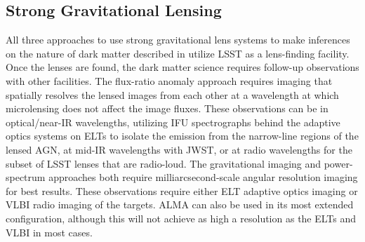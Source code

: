 \subsection{Strong Gravitational Lensing}
\label{sec:SLcomplement}

All three approaches to use strong gravitational lens systems to make inferences on the nature of dark matter  described in  utilize LSST as a lens-finding facility.
Once the lenses are found, the dark matter science requires follow-up observations with other facilities.
The flux-ratio anomaly approach requires imaging that spatially resolves the lensed images from each other at a wavelength at which microlensing does not affect the image fluxes.
These observations can be in optical/near-IR wavelengths, utilizing IFU spectrographs behind the adaptive optics systems on ELTs to isolate the emission from the narrow-line regions of the lensed AGN, at mid-IR wavelengths with JWST, or at radio wavelengths for the subset of LSST lenses that are radio-loud.
The gravitational imaging and power-spectrum approaches both require milliarcsecond-scale angular resolution imaging for best results.
These observations require either ELT adaptive optics imaging or VLBI radio imaging of the targets.
ALMA can also be used in its most extended configuration, although this will not achieve as high a resolution as the ELTs and VLBI in most cases.




